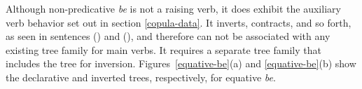 Although non-predicative {\it be} is not a raising verb, it does exhibit the
auxiliary verb behavior set out in section \ref{copula-data}.  It inverts,
contracts, and so forth, as seen in sentences ({}) and ({}), and
therefore can not be associated with any existing tree family for main verbs.
It requires a separate tree family that includes the tree for inversion.
Figures~\ref{equative-be}(a) and \ref{equative-be}(b) show the declarative and
inverted trees, respectively, for equative {\it be}.



